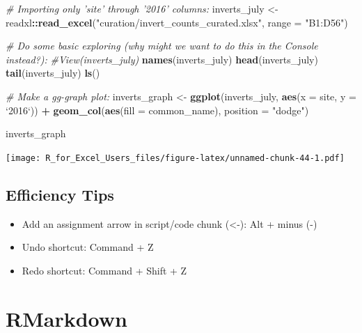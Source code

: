 \documentclass[]{book}
\newenvironment{Shaded}{\begin{snugshade}}{\end{snugshade}}
\newcommand{\CommentTok}[1]{\textcolor[rgb]{0.56,0.35,0.01}{\textit{#1}}}
\newcommand{\DataTypeTok}[1]{\textcolor[rgb]{0.13,0.29,0.53}{#1}}
\newcommand{\KeywordTok}[1]{\textcolor[rgb]{0.13,0.29,0.53}{\textbf{#1}}}
\newcommand{\NormalTok}[1]{#1}
\newcommand{\OperatorTok}[1]{\textcolor[rgb]{0.81,0.36,0.00}{\textbf{#1}}}
\newcommand{\StringTok}[1]{\textcolor[rgb]{0.31,0.60,0.02}{#1}}
\providecommand{\tightlist}{%
  \setlength{\itemsep}{0pt}\setlength{\parskip}{0pt}}
\begin{document}
\begin{Shaded}
\begin{Highlighting}[]
\CommentTok{# Importing only 'site' through '2016' columns: }
\NormalTok{inverts_july <-}\StringTok{ }\NormalTok{readxl}\OperatorTok{::}\KeywordTok{read_excel}\NormalTok{(}\StringTok{"curation/invert_counts_curated.xlsx"}\NormalTok{, }\DataTypeTok{range =} \StringTok{"B1:D56"}\NormalTok{)}

\CommentTok{# Do some basic exploring (why might we want to do this in the Console instead?):}
\CommentTok{#View(inverts_july)}
\KeywordTok{names}\NormalTok{(inverts_july)}
\KeywordTok{head}\NormalTok{(inverts_july)}
\KeywordTok{tail}\NormalTok{(inverts_july)}
\KeywordTok{ls}\NormalTok{()}

\CommentTok{# Make a gg-graph plot: }
\NormalTok{inverts_graph <-}\StringTok{ }\KeywordTok{ggplot}\NormalTok{(inverts_july, }\KeywordTok{aes}\NormalTok{(}\DataTypeTok{x =}\NormalTok{ site, }\DataTypeTok{y =} \StringTok{`}\DataTypeTok{2016}\StringTok{`}\NormalTok{)) }\OperatorTok{+}
\StringTok{  }\KeywordTok{geom_col}\NormalTok{(}\KeywordTok{aes}\NormalTok{(}\DataTypeTok{fill =}\NormalTok{ common_name), }
           \DataTypeTok{position =} \StringTok{"dodge"}\NormalTok{)}
\end{Highlighting}
\end{Shaded}

\begin{Shaded}
\begin{Highlighting}[]
\NormalTok{inverts_graph}
\end{Highlighting}
\end{Shaded}

\texttt{[image: R\_for\_Excel\_Users\_files/figure-latex/unnamed-chunk-44-1.pdf]}

\hypertarget{efficiency-tips-1}{%
\section{Efficiency Tips}\label{efficiency-tips-1}}

\begin{itemize}
\tightlist
\item
  Add an assignment arrow in script/code chunk (\textless{}-): Alt + minus (-)
\item
  Undo shortcut: Command + Z
\item
  Redo shortcut: Command + Shift + Z
\end{itemize}

\hypertarget{rmarkdown}{%
\chapter{RMarkdown}\label{rmarkdown}}
\end{document}
